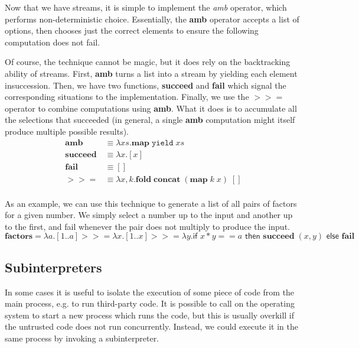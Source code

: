 \documentclass[11pt]{article}
\newcommand{\maybePage}{\newpage}
\newcommand\x{\lambda x}
\begin{document}
Now that we have streams, it is simple to implement the \emph{amb} operator, which performs non-deterministic choice.
Essentially, the \textbf{amb} operator accepts a list of options, then chooses just the correct elements to ensure the following computation does not fail.

Of course, the technique cannot be magic, but it does rely on the backtracking ability of streams.
First, \textbf{amb} turns a list into a stream by yielding each element insuccession.
Then, we have two functions, \textbf{succeed} and \textbf{fail} which signal the corresponding situations to the implementation.
Finally, we use the $>\!>=$ operator to combine computations using \textbf{amb}.
What it does is to accumulate all the selections that succeeded (in general, a single \textbf{amb} computation might itself produce multiple possible results).
\begin{align*}
\textbf{amb} &\equiv \x s. \textbf{map}\;\texttt{yield}\;xs \\
\textbf{succeed} &\equiv \x. [x] \\
\textbf{fail} &\equiv [] \\
>\!>= &\equiv \lambda x,k. \textbf{fold}\;\textbf{concat}\;(\textbf{map}\;k\;x)\;[] \\
\end{align*}

As an example, we can use this technique to generate a list of all pairs of factors for a given number.
We simply select a number up to the input and another up to the first, and fail whenever the pair does not multiply to produce the input.
$$\textbf{factors} = \lambda a. [1..a] >\!>= \x.
                             [1..x] >\!>= \lambda y.
                             \textsf{if }x*y == a
                             \textsf{ then }\textbf{succeed}\;(x, y)
                             \textsf{ else }\textbf{fail}$$


\maybePage
\subsection{Subinterpreters}

In some cases it is useful to isolate the execution of some piece of code from the main process, e.g. to run third-party code.
It is possible to call on the operating system to start a new process which runs the code, but this is usually overkill if the untrusted code does not run concurrently.
Instead, we could execute it in the same process by invoking a subinterpreter.
\end{document}
